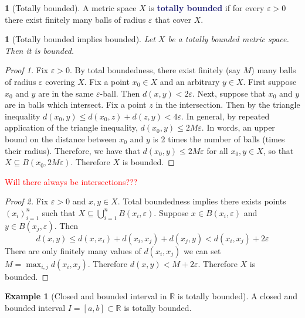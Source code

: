 \documentclass[12pt]{article}
\numberwithin{equation}{section}
\newcommand{\navy}[1]{\textcolor{MidnightBlue}{\bf #1}}
\theoremstyle{plain}
\newtheorem{claim}{\color{ForestGreen}{\textbf{Claim}}}[section]
\theoremstyle{definition}
\newtheorem{definition}{\color{MidnightBlue}{\textbf{Definition}}}[section]
\newtheorem{example}{\color{WildStrawberry}Example}[section]
\newcommand{\1}{\mathbbm 1}
\newcommand{\e}{\varepsilon}
\newcommand{\RR}{\mathbb R}
\begin{document}
\begin{definition}[Totally bounded]
	A metric space $X$ is \navy{totally bounded} if for every $\e > 0$ there exist finitely many balls of radius $\e$ that cover $X$. 
\end{definition}

\begin{claim}[Totally bounded implies bounded]
	Let $X$ be a totally bounded metric space. Then it is bounded. 
\end{claim}
\begin{proof}[Proof 1]
	Fix $\e > 0$. By total boundedness, there exist finitely (say $M$) many balls of radius $\e$ covering $X$. Fix a point $x_0 \in X$ and an arbitrary $y \in X$. First suppose $x_0$ and $y$ are in the same $\e$-ball. Then $d(x,y) < 2\e$. Next, suppose that $x_0$ and $y$ are in balls which intersect. Fix a point $z$ in the intersection. Then by the triangle inequality $d(x_0,y) \leq d(x_0,z) + d(z,y) < 4 \e$. In general, by repeated application of the triangle inequality, $d(x_0,y) \leq 2M \e$. In words, an upper bound on the distance between $x_0$ and $y$ is 2 times the number of balls (times their radius). Therefore, we have that $d(x_0,y) \leq 2M \e$ for all $x_0, y \in X$, so that $X \subseteq B(x_0, 2M\e)$. Therefore $X$ is bounded.  
\end{proof}

\textcolor{red}{Will there always be intersections???}

\begin{proof}[Proof 2]
	Fix $\e > 0$ and $x,y \in X$. Total boundedness implies there exists points $(x_i)_{i=1}^n$ such that $X \subseteq \bigcup_{i=1}^n B(x_i, \e)$. Suppose $x \in B(x_i,\e)$ and $y \in B(x_j,\e)$. Then 
	\begin{equation}
	 	d(x,y) \leq d(x,x_i) + d(x_i, x_j) + d(x_j,y) < d(x_i, x_j) + 2\e
	 \end{equation} 
	 There are only finitely many values of $d(x_i, x_j)$ we can set $M = \max_{i,j} d(x_i, x_j)$. Therefore $d(x,y) < M + 2\e$. Therefore $X$ is bounded. 
\end{proof}


\begin{example}[Closed and bounded interval in $\RR$ is totally bounded]
	A closed and bounded interval $I = [a,b] \subset \RR$ is totally bounded. 
\end{example}
\end{document}
